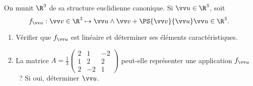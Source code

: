 \begin{enonce}
\begin{exercise}[ID={RMS123 E614 Mines PSI},subtitle={},tags={}, difficulty={0}]
On munit $\R^3$ de sa structure euclidienne canonique.
Si $\vv u\in\R^3$, soit
\begin{equation*}
  f_{\vv u} : \vv v\in\R^3 \mapsto \vv u\wedge \vv v+ \PS{\vv v}{\vv u} \vv u\in\R^3.
\end{equation*}
\begin{enumerate}
  \item Vérifier que $f_{\vv u}$ est linéaire et déterminer ses éléments caractéristiques.
  \item La matrice
    \begin{math}
      A=
      \frac13
      \begin{pmatrix}
      2&1&-2\\
      1&2&2\\
      2&-2&1
      \end{pmatrix}
    \end{math}
    peut-elle représenter une application $f_{\vv u}$~?
    Si oui, déterminer $\vv u$.
\end{enumerate}
\end{exercise}
\begin{solution}
\end{solution}
\end{enonce}
